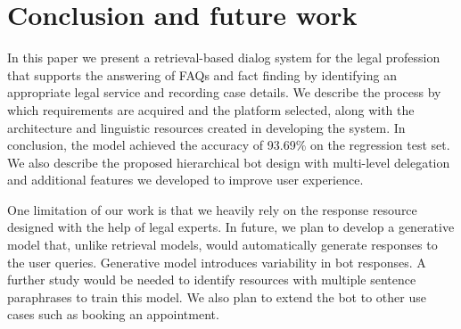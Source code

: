 \documentclass[runningheads]{llncs}
\begin{document}
\section{Conclusion and future work}\label{conclusion}
In this paper we present a retrieval-based dialog system for the legal profession that supports the answering of FAQs and fact finding by identifying an appropriate legal service and recording case details. We describe the process by which requirements are acquired and the platform selected, along with the architecture and linguistic resources created in developing the system. In conclusion, the model achieved the accuracy of 93.69\% on the regression test set. We also describe the proposed hierarchical bot design with multi-level delegation and additional features we developed to improve user experience.

One limitation of our work is that we heavily rely on the response resource designed with the help of legal experts. In future, we plan to develop a generative model that, unlike retrieval models, would automatically generate responses to the user queries. Generative model introduces variability in bot responses. A further study would be needed to identify resources with multiple sentence paraphrases to train this model. We also plan to extend the bot to other use cases such as booking an appointment.

%
%
%


%


\end{document}
